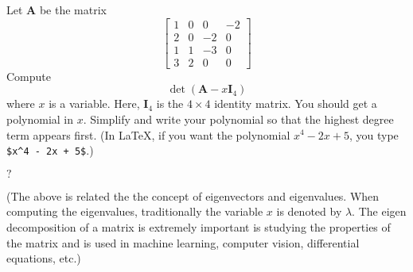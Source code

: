 \nextq
Let $\mathbf{A}$ be the matrix
\[
\begin{bmatrix}
1  &  0  &   0  &  -2 \\
2  &  0  &  -2  &   0 \\
1  &  1  &  -3  &   0 \\
3  &  2  &   0  &   0
\end{bmatrix}
\]
Compute
\[
\det
\left(
\mathbf{A} - x \mathbf{I}_4
\right)
\]
where $x$ is a variable.
Here, $\mathbf{I}_4$ is the $4 \times 4$ identity matrix.
You should get a polynomial in $x$.
Simplify and write your polynomial so that the highest degree term
appears first.
(In \LaTeX, if you want the polynomial $x^4 - 2x + 5$,
you type \verb!$x^4 - 2x + 5$!.)
\\
\ANSWER
\begin{answerlong}
$?$
\end{answerlong}
(The above is related the the concept of eigenvectors and eigenvalues.
When computing the eigenvalues, traditionally the variable $x$ is
denoted by $\lambda$. The eigen decomposition of a matrix is extremely
important is studying the properties of the matrix and is used in
machine learning, computer vision, differential equations, etc.)

\newpage

